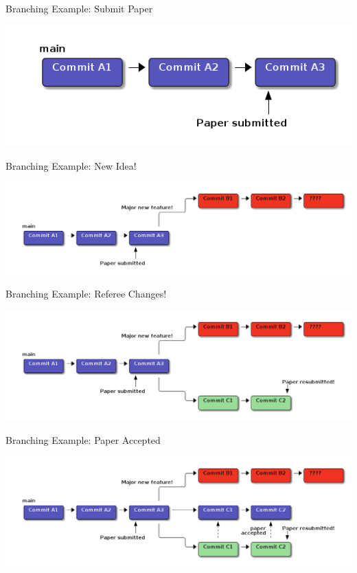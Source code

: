 \documentclass[presentation, smaller, aspectratio=169]{beamer}
\begin{document}
\begin{frame}[label={sec:orgcbbc9e3}]{Branching Example: Submit Paper}
\begin{center}
\includegraphics[scale=0.3]{figures/main_branch_020.png}
\label{branching_020_submit_paper}
\end{center}
\end{frame}
\begin{frame}[label={sec:orgd4ab1fb}]{Branching Example: New Idea!}
\begin{center}
\includegraphics[scale=0.3]{figures/main_branch_030.png}
\label{branching_30_develop_new_idea}
\end{center}
\end{frame}
\begin{frame}[label={sec:org91a9870}]{Branching Example: Referee Changes!}
\begin{center}
\includegraphics[scale=0.3]{figures/main_branch_040.png}
\label{branching_40_referee_changes}
\end{center}
\end{frame}
\begin{frame}[label={sec:org03792d7}]{Branching Example: Paper Accepted}
\begin{center}
\includegraphics[scale=0.3]{figures/main_branch_050.png}
\label{branching_50_paper_accepted}
\end{center}
\end{frame}
\end{document}
